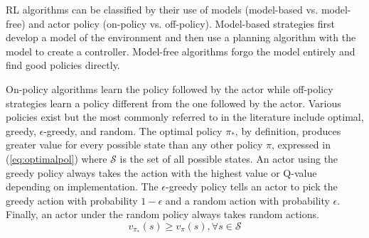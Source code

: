 RL algorithms can be classified by their use of models (model-based vs. model-free) and actor policy (on-policy vs. off-policy). Model-based strategies first develop a model of the environment and then use a planning algorithm with the model to create a controller. Model-free algorithms forgo the model entirely and find good policies directly. 

On-policy algorithms learn the policy followed by the actor while off-policy strategies learn a policy different from the one followed by the actor. Various policies exist but the most commonly referred to in the literature include optimal, greedy, $\epsilon$-greedy, and random. The optimal policy $\pi_*$, by definition, produces greater value for every possible state than any other policy $\pi$, expressed in (\ref{eq:optimalpol}) where $\mathcal{S}$ is the set of all possible states. An actor using the greedy policy always takes the action with the highest value or Q-value depending on implementation. The $\epsilon$-greedy policy tells an actor to pick the greedy action with probability $1-\epsilon$ and a random action with probability $\epsilon$. Finally, an actor under the random policy always takes random actions.
\begin{equation}
	\label{eq:optimalpol}
v_{\pi_*}(s) \geq v_{\pi}(s), \forall s \in \mathcal{S}
\end{equation}

